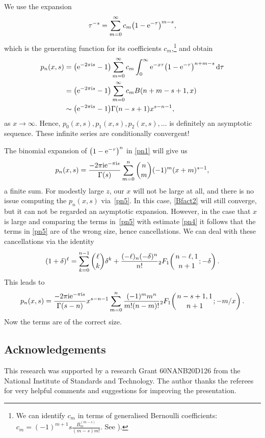 \documentclass[pdftex]{sigma}
\numberwithin{equation}{section}
\def\genhyperF#1#2#3#4#5#6{{{}_{#1}F_{#2}}\!\left(\genfrac{}{}{0pt}{}{#3, #4}{#5};#6\right)}
\def\expe{{\rm e}}
\def\iunit{{\rm i}}
\def\id{\,{\rm d}}
\begin{document}
We use the expansion
\[\tau^{-s}=\sum_{m=0}^\infty c_m\bigl(1-\expe^{-\tau}\bigr)^{m-s},\]
which is the generating function for its coefficients
$c_m$,\footnote{We can identify $c_m$ in terms of generalised
Bernoulli coefficients: $c_m =(-1)^{m+1} s\frac{B_m^{(m-s)}}{(m - s)m!}$.
See \cite[\href{https://dlmf.nist.gov/24.16.E4}{equation~(24.16.4)}]{NIST:DLMF}).} and obtain
\begin{align}
 p_n(x,s)&=\bigl(\expe^{-2\pi\iunit s}-1\bigr)\sum_{m=0}^\infty c_m
 \int_0^{\infty}\expe^{-x\tau}\bigl(1-\expe^{-\tau}\bigr)^{n+m-s}\id\tau\nonumber\\
 &=\bigl(\expe^{-2\pi\iunit s}-1\bigr)\sum_{m=0}^\infty c_m B(n+m-s+1,x)\nonumber\\
 &\sim \bigl(\expe^{-2\pi\iunit s}-1\bigr)\Gamma(n-s+1)x^{s-n-1},\label{pn4}
\end{align}
as $x\to\infty$. Hence, $p_0(x,s),p_1(x,s),p_2(x,s),\ldots$ is definitely
an asymptotic sequence. These infinite series are conditionally convergent!

The binomial expansion of $\bigl(1-\expe^{-\tau}\bigr)^n$ in \eqref{pn1} will give us
\begin{equation}\label{pn5}
 p_n(x,s)=\frac{-2\pi\iunit\expe^{-\pi\iunit s}}{\Gamma(s)}
 \sum_{m=0}^n {n\choose m}(-1)^m(x+m)^{s-1},
\end{equation}
a finite sum. For modestly large $z$, our $x$ will not be large at all, and there is no
issue computing the $p_n(x,s)$ via~\eqref{pn5}. In this case, \eqref{Bfact2} will still converge,
but it can not be regarded an asymptotic expansion. However, in the case that $x$ is large
and comparing the terms in~\eqref{pn5} with estimate \eqref{pn4} it follows that the terms
in \eqref{pn5} are of the wrong size, hence cancellations. We can
deal with these cancellations via the identity
\[(1+\delta)^{\ell}=
\sum_{k=0}^{n-1}{\ell\choose k}\delta^k+\frac{(-\ell)_n(-\delta)^n}{n!}
\genhyperF{2}{1}{n-\ell}{1}{n+1}{-\delta}.\]
 This leads to
\begin{equation*}%
 p_n(x,s)=\frac{-2\pi\iunit\expe^{-\pi\iunit s}}{\Gamma(s-n)}x^{s-n-1}
 \sum_{m=0}^n \frac{(-1)^m m^n}{m! (n-m)!}\genhyperF{2}{1}{n-s+1}{1}{n+1}{-m/x}.
\end{equation*}
Now the terms are of the correct size.

\subsection*{Acknowledgements}
This research was supported by a research Grant 60NANB20D126 from the National Institute
of Standards and Technology. The author thanks the referees for very helpful comments and
suggestions for improving the presentation.
\end{document}
